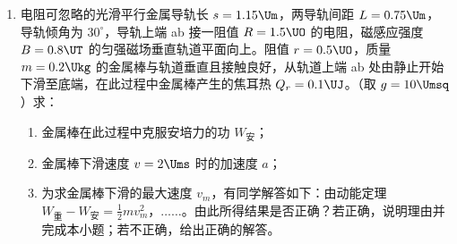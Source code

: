 \documentclass[\gkver]{gaokaozhenti}
\begin{document}
\begin{enumerate}
\item
电阻可忽略的光滑平行金属导轨长 $s = 1.15\Um$，两导轨间距 $L = 0.75\Um$，导轨倾角为 $30^{\circ}$，导轨上端 ab 接一阻值 $R = 1.5\UO$ 的电阻，磁感应强度 $B = 0.8\UT$ 的匀强磁场垂直轨道平面向上。阻值 $r = 0.5\UO$，质量 $m = 0.2\Ukg$ 的金属棒与轨道垂直且接触良好，从轨道上端 ab 处由静止开始下滑至底端，在此过程中金属棒产生的焦耳热 $Q_{r} = 0.1\UJ$。（取 $g = 10\Umsq$）求：
\begin{enumerate}
	\item
	金属棒在此过程中克服安培力的功 $W_{\text{安}}$；
	\item
	金属棒下滑速度 $v = 2\Ums$ 时的加速度 $a$；
	\item
	为求金属棒下滑的最大速度 $v_{m}$，有同学解答如下：由动能定理 $W_{\text{重}} - W_{\text{安}} = \frac{1}{2}mv_{m}^{2}$，$\ldots\ldots$。由此所得结果是否正确？若正确，说明理由并完成本小题；若不正确，给出正确的解答。
\end{enumerate}
\onepicture[align=right, w=5.39cm]{}
\end{enumerate}
\end{document}
